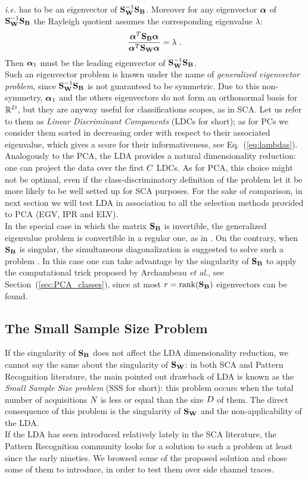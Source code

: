 \textit{i.e.} has to be an eigenvector of $\SW^{-1} \SB$. Moreover for any eigenvector $\AAlpha$ of $\SW^{-1}\SB$ the Rayleigh quotient assumes the corresponding eigenvalue $\lambda$:
\begin{equation}\label{eq:lambdas}
\frac{\AAlpha^T \SB \AAlpha}{\AAlpha^T \SW \AAlpha} = \lambda \mbox{ .}
\end{equation}
Then $\AAlpha_1$ must be the leading eigenvector of $\SW^{-1} \SB$.\\
Such an eigenvector problem is known under the name of {\em generalized eigenvector problem}, since $\SW^{-1} \SB$ is not guaranteed to be symmetric. Due to this non-symmetry,  $\AAlpha_1$ and the others eigenvectors do not form an orthonormal basis for $\mathbb{R}^\traceLength$, but they are anyway useful for classifications scopes, as in SCA. Let us refer to them as {\em Linear Discriminant Components} (LDCs for short); as for PCs we consider them sorted in decreasing order with respect to their associated eigenvalue, which gives a score for their informativeness, see Eq.~(\ref{eq:lambdas}). Analogously to the PCA, the LDA provides a natural dimensionality reduction: one can project the data over the first $\newTraceLength$ LDCs. As for PCA, this choice might not be optimal, even if the class-discriminatory definition of the problem let it be more likely to be well setted up for SCA purposes. For the sake of comparison, in next section we will test LDA in association to all the selection methods provided to PCA (EGV, IPR and ELV).\\
In the special case in which the matrix $\SB$ is invertible, the generalized eigenvalue problem is convertible in a regular one, as in \cite{Standaert2008}. On the contrary, when $\SB$ is singular, the simultaneous diagonalization is suggested to solve such a problem \cite{Fukunaga}. In this case one can take advantage by the singularity of $\SB$ to apply the computational trick proposed by Archambeau \textit{et al.}, see Section~(\ref{sec:PCA_classes}), since at most $r = \mathrm{rank}(\SB)$ eigenvectors can be found.\\


\subsection{The Small Sample Size Problem}\label{sec:SSS}
If the singularity of $\SB$ does not affect the LDA dimensionality reduction, we cannot say the same about the singularity of $\SW$: in both SCA and Pattern Recognition literature, the main pointed out drawback of LDA is known as the {\em Small Sample Size problem} (SSS for short): this problem occurs when the total number of acquisitions $\numTraces[]$ is less or equal than the size $\traceLength$ of them. The direct consequence of this problem is the singularity of $\SW$ and the non-applicability of the LDA.\\
If the LDA has seen introduced relatively lately in the SCA literature, the Pattern Recognition community looks for a solution to such a problem at least since the early nineties. We browsed some of the proposed solution and chose some of them to introduce, in order to test them over side channel traces.

